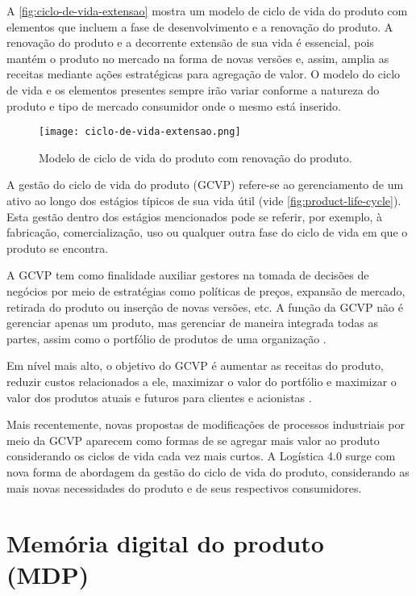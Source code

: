 A \autoref{fig:ciclo-de-vida-extensao} mostra um modelo de ciclo de vida do produto com elementos que incluem a fase de desenvolvimento e a renovação do produto. A renovação do produto e a decorrente extensão de sua vida é essencial, pois mantém o produto no mercado na forma de novas versões e, assim, amplia as receitas mediante ações estratégicas para agregação de valor. O modelo do ciclo de vida e os elementos presentes sempre irão variar conforme a natureza do produto e tipo de mercado consumidor onde o mesmo está inserido.

\begin{figure}[htb]
	\centering
	\texttt{[image: ciclo-de-vida-extensao.png]}
	\caption{Modelo de ciclo de vida do produto com renovação do produto.}
	\label{fig:ciclo-de-vida-extensao}
\end{figure}

A gestão do ciclo de vida do produto (GCVP) refere-se ao gerenciamento de um ativo ao longo dos estágios típicos de sua vida útil (vide \autoref{fig:product-life-cycle}). Esta gestão dentro dos estágios mencionados pode se referir, por exemplo, à fabricação, comercialização, uso ou qualquer outra fase do ciclo de vida em que o produto se encontra.

A GCVP tem como finalidade auxiliar gestores na tomada de decisões de negócios por meio de estratégias como políticas de preços, expansão de mercado, retirada do produto ou inserção de novas versões, etc. A função da GCVP não é gerenciar apenas um produto, mas gerenciar de maneira integrada todas as partes, assim como o portfólio de produtos de uma organização \cite{stark2015lifecycle}.

Em nível mais alto, o objetivo do GCVP é aumentar as receitas do produto, reduzir custos relacionados a ele, maximizar o valor do portfólio e maximizar o valor dos produtos atuais e futuros para clientes e acionistas \cite{stark2015lifecycle}.

Mais recentemente, novas propostas de modificações de processos industriais por meio da GCVP aparecem como formas de se agregar mais valor ao produto considerando os ciclos de vida cada vez mais curtos. A Logística 4.0 surge com nova forma de abordagem da gestão do ciclo de vida do produto, considerando as mais novas necessidades do produto e de seus respectivos consumidores.

\section{Memória digital do produto (MDP)}
\label{sec:mdp}

